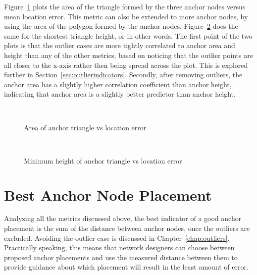 Figure~\ref{fig:AnchorArea} plots the area of the triangle formed by the three anchor nodes versus mean location error.  This metric can also be extended to more anchor nodes, by using the area of the polygon formed by the anchor nodes.  Figure~\ref{fig:AnchorHeight} does the same for the shortest triangle height, or in other words. The first point of the two plots is that the outlier cases are more tightly correlated to anchor area and height than any of the other metrics, based on noticing that the outlier points are all closer to the x-axis rather then being spread across the plot. This is explored further in Section~\ref{sec:outlierindicators}.  Secondly, after removing outliers, the anchor area has a slightly higher correlation coefficient than anchor height, indicating that anchor area is a slightly better predictor than anchor height.

\begin{figure}
  \centering
\\
	\caption{Area of anchor triangle vs location error}	
	\label{fig:AnchorArea}
\end{figure}

\begin{figure}
  \centering
		\\
	\caption{Minimum height of anchor triangle vs location error}	
	\label{fig:AnchorHeight}
\end{figure}

\section{Best Anchor Node Placement}

Analyzing all the metrics discussed above, the best indicator of a good anchor placement is the sum of the distance between anchor nodes, once the outliers are excluded.  Avoiding the outlier case is discussed in Chapter~\ref{chap:outliers}.  Practically speaking, this means that network designers can choose between proposed anchor placements and use the measured distance between them to provide guidance about which placement will result in the least amount of error. 

